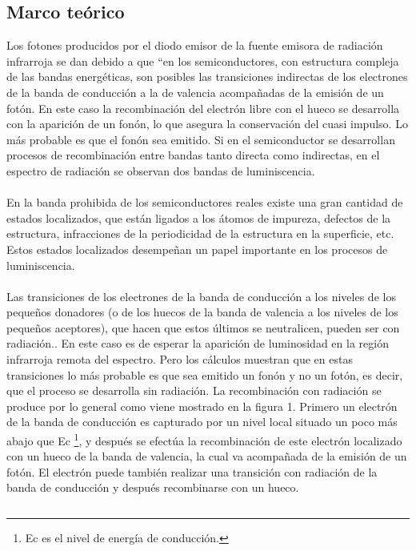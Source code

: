 \documentclass[12]{article}
\newenvironment{Figure}
{\par\medskip\noindent\minipage{\linewidth}}
{\endminipage\par\medskip}
\begin{document}
\begin{multicols}{2}
\section{Marco teórico}
Los fotones producidos por el diodo emisor de la fuente emisora de radiación infrarroja se dan debido a que “en los semiconductores, con estructura compleja de las bandas energéticas, son posibles las transiciones indirectas de los electrones de la banda de conducción  a la de valencia acompañadas de la emisión de un fotón. En este caso la recombinación del electrón libre con el hueco se desarrolla con la aparición de un fonón, lo que asegura la conservación del cuasi impulso. Lo más probable es que el fonón sea emitido. Si en el semiconductor se desarrollan procesos de recombinación entre bandas  tanto directa como indirectas, en el espectro de radiación se observan dos bandas de luminiscencia. \\ \\
En la banda prohibida de los semiconductores reales existe una gran cantidad de estados localizados, que están ligados a los átomos de impureza, defectos de la estructura, infracciones de la periodicidad de la estructura en la superficie, etc. Estos estados localizados desempeñan un papel importante  en los procesos de luminiscencia. \\ \\
Las transiciones de los electrones de la banda de conducción a los niveles de los pequeños donadores (o de los huecos de la banda de valencia a los niveles de los pequeños aceptores),  que hacen que estos últimos se neutralicen, pueden ser con radiación.. En este caso es de esperar la aparición de luminosidad en la región infrarroja remota del espectro. Pero los cálculos  muestran que en estas transiciones lo más probable es que sea emitido un fonón y no un fotón, es decir, que el proceso se desarrolla sin radiación. La recombinación con radiación se produce por lo general  como viene mostrado en la figura 1. Primero un electrón de la banda de conducción es capturado por un nivel local situado un poco más abajo que Ec  \footnote{Ec es el nivel de energía de conducción.}, y después se efectúa la recombinación de este electrón localizado con un hueco de la banda de valencia, la cual va acompañada de la emisión de un fotón. El electrón puede también realizar una transición con radiación de la banda de conducción y después recombinarse con un hueco. \\
\begin{Figure}	
\center
\begin{tabular}{|l|r|}

\end{tabular}
\end{Figure}
\end{multicols}
\end{document}
